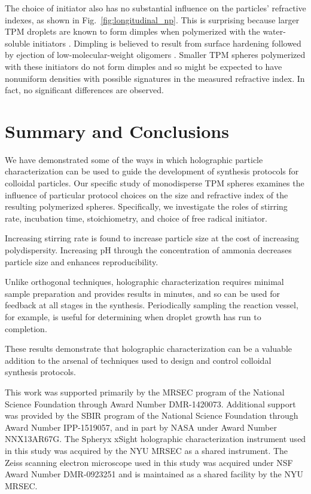 \documentclass[journal=langd5,manuscript=article]{achemso}
\begin{document}
The choice of initiator also has no substantial
influence on the particles' refractive indexes,
as shown in Fig.~\ref{fig:longitudinal_np}.
This is surprising because
larger TPM droplets are known to form dimples when polymerized
with the water-soluble initiators \cite{sacanna11}.
Dimpling is believed to result from
surface hardening followed by
ejection of low-molecular-weight oligomers \cite{sacanna11}.
Smaller TPM spheres polymerized with these
initiators do not form dimples \cite{vanderwel17}
and so might 
be expected to have nonuniform densities
with possible signatures in the measured refractive
index.  In fact, no significant differences are observed.

\section{Summary and Conclusions}
\label{sec:discussion}

We have demonstrated some of the ways in which 
holographic particle characterization
can be used to guide the development of synthesis
protocols for colloidal particles.
Our specific study of monodisperse TPM spheres
examines the influence of particular protocol
choices on the size and refractive index of 
the resulting polymerized spheres. Specifically,
we investigate the roles of stirring rate, 
incubation time, stoichiometry, and choice of
free radical initiator.

Increasing stirring rate is found to increase particle
size at the cost of increasing polydispersity.
Increasing pH through the concentration of ammonia 
decreases particle size and enhances 
reproducibility.

Unlike orthogonal techniques, holographic characterization requires minimal
sample preparation and provides results in minutes,
and so can be used for feedback at all stages in
the synthesis.
Periodically sampling the reaction vessel, for example, 
is useful for determining when droplet growth has
run to completion.

These results demonstrate that holographic characterization can be a valuable
addition to the arsenal of techniques used to design and control colloidal
synthesis protocols.

\begin{acknowledgement}
This work was supported primarily by the MRSEC program of
the National Science Foundation through Award Number DMR-1420073.
Additional support was provided by the SBIR program of the
National Science Foundation through Award Number IPP-1519057, and in part by
NASA under Award Number NNX13AR67G.
The Spheryx xSight holographic characterization instrument
used in this study was acquired by the NYU MRSEC as a shared
instrument.
The Zeiss scanning electron microscope used in this study
was acquired under
NSF Award Number DMR-0923251 and is maintained as a shared
facility by the NYU MRSEC.

\end{acknowledgement}
\end{document}
